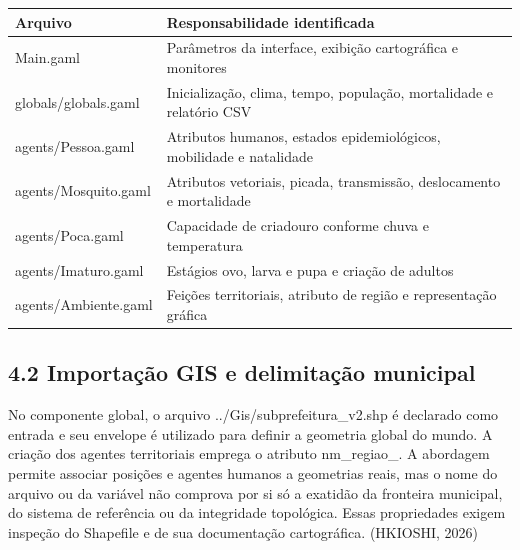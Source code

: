 \begin{longtable}[]{@{}
  >{\raggedright\arraybackslash}p{}
  >{\raggedright\arraybackslash}p{}@{}}
\toprule\noalign{}
\begin{minipage}[b]{\linewidth}\raggedright
\textbf{Arquivo}
\end{minipage} & \begin{minipage}[b]{\linewidth}\raggedright
\textbf{Responsabilidade identificada}
\end{minipage} \\
\midrule\noalign{}
\endhead
\bottomrule\noalign{}
\endlastfoot
Main.gaml & Parâmetros da interface, exibição cartográfica e
monitores \\
globals/globals.gaml & Inicialização, clima, tempo, população,
mortalidade e relatório CSV \\
agents/Pessoa.gaml & Atributos humanos, estados epidemiológicos,
mobilidade e natalidade \\
agents/Mosquito.gaml & Atributos vetoriais, picada, transmissão,
deslocamento e mortalidade \\
agents/Poca.gaml & Capacidade de criadouro conforme chuva e
temperatura \\
agents/Imaturo.gaml & Estágios ovo, larva e pupa e criação de adultos \\
agents/Ambiente.gaml & Feições territoriais, atributo de região e
representação gráfica \\
\end{longtable}

\subsection{4.2 Importação GIS e delimitação
municipal}\label{importauxe7uxe3o-gis-e-delimitauxe7uxe3o-municipal}

No componente global, o arquivo ../Gis/subprefeitura\_v2.shp é declarado
como entrada e seu envelope é utilizado para definir a geometria global
do mundo. A criação dos agentes territoriais emprega o atributo
nm\_regiao\_. A abordagem permite associar posições e agentes humanos a
geometrias reais, mas o nome do arquivo ou da variável não comprova por
si só a exatidão da fronteira municipal, do sistema de referência ou da
integridade topológica. Essas propriedades exigem inspeção do Shapefile
e de sua documentação cartográfica. (HKIOSHI, 2026)

